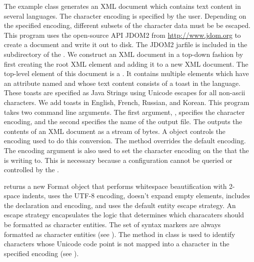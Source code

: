 The example class  generates an XML document
which contains text content in several languages.
The character encoding is specified by the user.
Depending on the specified encoding, different subsets of the
character data must be be escaped.
%
%
This program uses the open-source API JDOM2 from \url{http://www.jdom.org}
to create a document and write it out to disk.
The JDOM2 jarfile is included in the subdirectory of the .
%
%
We construct an XML document in a top-down fashion by first creating
the root XML element and adding it to a new XML document.
The top-level element of this document is a .
It contains multiple  elements which have 
an attribute named  and whose text content consists
of a toast in the language.
%
%
These toasts are specified as Java Strings using Unicode escapes 
for all non-ascii characters.
%
%
We add toasts in English, French, Russian, and Korean.
%
%
This program takes two command line arguments.
The first argument, , specifies the character encoding,
and the second specifies the name of the output file.
The  outputs the contents of an
XML document as a stream of bytes.
A  object controls
the encoding used to do this conversion.
The method  overrides the default
encoding.
The encoding argument is also used to set the character encoding on 
the  that the  is writing to.
This is necessary because a  configuration cannot be queried
or controlled by the .

 returns a new Format object that
performs whitespace beautification with 2-space indents, uses the
UTF-8 encoding, doesn't expand empty elements, includes the
declaration and encoding, and uses the default entity escape strategy.
An escape strategy encapsulates the logic that determines
which characaters should be formatted as character entities.
The set of syntax markers are always formatted as character entities
(see ).  The method  in class
 is used to identify characters
whose Unicode code point is not mapped into a character in the specified encoding
(see ).

